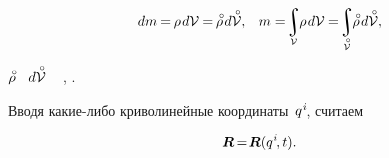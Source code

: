 \begin{otherlanguage}{russian}
\nopagebreak\vspace{-0.2em}\begin{equation}\label{balanceofmass}
dm \hspace{-0.15ex} = \hspace{-0.2ex} \rho \hspace{.2ex} d\mathcal{V} \hspace{-0.1ex} = \hspace{-0.2ex} \mathcircabove{\rho} \hspace{.22ex} d\mathcircabove{\mathcal{V}} ,
\hspace{.8em}
%
m = \hspace{-0.4ex} \scalebox{0.9}{$\displaystyle\integral\displaylimits_{\mathcal{V}}$} \hspace{-0.2ex} \rho \hspace{.2ex} d\mathcal{V} \hspace{-0.1ex}
= \hspace{-0.4ex} \scalebox{0.9}{$\displaystyle\integral\displaylimits_{\mathcircabove{\mathcal{V}}}$} \hspace{-0.2ex} \mathcircabove{\rho} \hspace{.22ex} d\mathcircabove{\mathcal{V}} ,
\end{equation}

\vspace{-0.6em} \noindent {} $\mathcircabove{\rho}$ ~${d\mathcircabove{\mathcal{V}}}$\ru{\:---}  ~ , .


Вводя какие\hbox{-}либо криволинейные координаты~${q^{\hspace{.1ex}i}\hspace{-0.4ex}}$, считаем

\nopagebreak\vspace{-0.2em}\begin{equation}\label{materialcoordinates}
\bm{R} \hspace{-0.25ex} = \hspace{-0.4ex} \bm{R}(q^{\hspace{.1ex}i} \hspace{-0.3ex}, t) .
\end{equation}


\end{otherlanguage}
